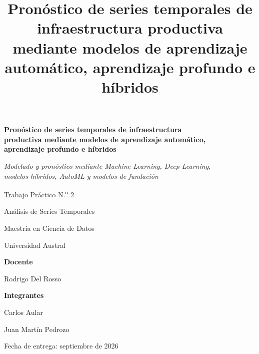 \documentclass[doc,11pt,donotrepeattitle]{apa7}
\title{Pronóstico de series temporales de infraestructura productiva mediante modelos de aprendizaje automático, aprendizaje profundo e híbridos}
\author{}
\affiliation{}
\begin{document}
\thispagestyle{empty}
\begin{center}
\vspace*{2.8cm}

{\Large\bfseries Pronóstico de series temporales de infraestructura\\[0.3em]
productiva mediante modelos de aprendizaje automático,\\[0.3em]
aprendizaje profundo e híbridos\par}

\vspace{0.8cm}
{\large\itshape Modelado y pronóstico mediante Machine Learning, Deep Learning,\\
modelos híbridos, AutoML y modelos de fundación\par}

\vspace{1.2cm}
{\large Trabajo Práctico N.\textsuperscript{o} 2\par}

\vspace{2cm}
{\large Análisis de Series Temporales\par}
\vspace{0.4em}
{\large Maestría en Ciencia de Datos\par}
\vspace{0.4em}
{\large Universidad Austral\par}

\vspace{2cm}
\textbf{Docente}\par
\vspace{0.4em}
Rodrigo Del Rosso\par

\vspace{2cm}
\textbf{Integrantes}\par
\vspace{0.4em}
Carlos Aular\par
\vspace{0.3em}
Juan Martín Pedrozo\par

\vfill
Fecha de entrega: septiembre de 2026
\end{center}
\newpage
\setcounter{page}{1}



\newpage
\tableofcontents
\newpage
\listoffigures
\listoftables
\newpage
\end{document}
